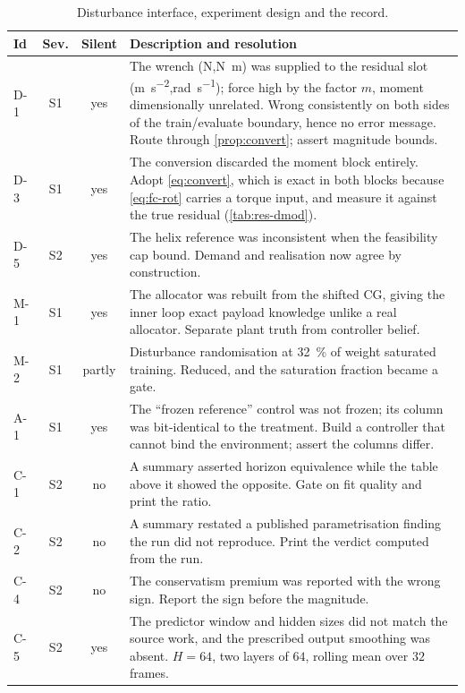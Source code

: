 \documentclass[11pt,a4paper,twoside,openright]{report}
\newcommand{\vH}{64}                     %
\newcommand{\vSmooth}{32}                %
\theoremstyle{plain}
\theoremstyle{definition}
\theoremstyle{remark}
\begin{document}
	\begin{table}[htbp]
		\centering
		\caption{Disturbance interface, experiment design and the record.}
		\label{tab:audit-rest}
		\scriptsize
		\begin{tabularx}{\linewidth}{@{}l c c X@{}}
			\toprule
			\textbf{Id} & \textbf{Sev.} & \textbf{Silent} & \textbf{Description and resolution} \\
			\midrule
			D-1 & S1 & yes & The wrench (\si{\newton},\si{\newton\metre}) was supplied to the residual slot (\si{\metre\per\square\second},\si{\radian\per\second}); force high by the factor $m$, moment dimensionally unrelated. Wrong consistently on both sides of the train/evaluate boundary, hence no error message. Route through \cref{prop:convert}; assert magnitude bounds. \\
			D-3 & S1 & yes & The conversion discarded the moment block entirely. Adopt \cref{eq:convert}, which is exact in both blocks because \cref{eq:fc-rot} carries a torque input, and measure it against the true residual (\cref{tab:res-dmod}). \\
			D-5 & S2 & yes & The helix reference was inconsistent when the feasibility cap bound. Demand and realisation now agree by construction. \\
			M-1 & S1 & yes & The allocator was rebuilt from the shifted CG, giving the inner loop exact payload knowledge unlike a real allocator. Separate plant truth from controller belief. \\
			M-2 & S1 & partly & Disturbance randomisation at \SI{32}{\percent} of weight saturated training. Reduced, and the saturation fraction became a gate. \\
			A-1 & S1 & yes & The ``frozen reference'' control was not frozen; its column was bit-identical to the treatment. Build a controller that cannot bind the environment; assert the columns differ. \\
			C-1 & S2 & no & A summary asserted horizon equivalence while the table above it showed the opposite. Gate on fit quality and print the ratio. \\
			C-2 & S2 & no & A summary restated a published parametrisation finding the run did not reproduce. Print the verdict computed from the run. \\
			C-4 & S2 & no & The conservatism premium was reported with the wrong sign. Report the sign before the magnitude. \\
			C-5 & S2 & yes & The predictor window and hidden sizes did not match the source work, and the prescribed output smoothing was absent. $H=\vH$, two layers of $64$, rolling mean over $\vSmooth$ frames. \\

\end{tabularx}
\end{table}
\end{document}
